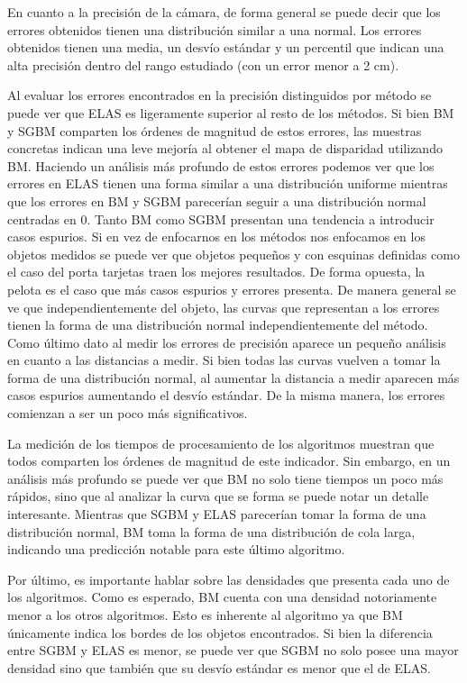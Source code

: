 \documentclass[11pt,a4paper,titlepage]{article}
\begin{document}
En cuanto a la precisión de la cámara, de forma general se puede decir que los errores obtenidos tienen una distribución similar a una normal. Los errores obtenidos tienen una media, un desvío estándar y un percentil que indican una alta precisión dentro del rango estudiado (con un error menor a 2 cm).

Al evaluar los errores encontrados en la precisión distinguidos por método se puede ver que ELAS es ligeramente superior al resto de los métodos. Si bien BM y SGBM comparten los órdenes de magnitud de estos errores, las muestras concretas indican una leve mejoría al obtener el mapa de disparidad utilizando BM.
Haciendo un análisis más profundo de estos errores podemos ver que los errores en ELAS tienen una forma similar a una distribución uniforme mientras que los errores en BM y SGBM parecerían seguir a una distribución normal centradas en 0. Tanto BM como SGBM presentan una tendencia a introducir casos espurios.
Si en vez de enfocarnos en los métodos nos enfocamos en los objetos medidos se puede ver que objetos pequeños y con esquinas definidas como el caso del porta tarjetas traen los mejores resultados. De forma opuesta, la pelota es el caso que más casos espurios y errores presenta. De manera general se ve que independientemente del objeto, las curvas que representan a los errores tienen la forma de una distribución normal independientemente del método.
Como último dato al medir los errores de precisión aparece un pequeño análisis en cuanto a las distancias a medir. Si bien todas las curvas vuelven a tomar la forma de una distribución normal, al aumentar la distancia a medir aparecen más casos espurios aumentando el desvío estándar. De la misma manera, los errores comienzan a ser un poco más significativos.

La medición de los tiempos de procesamiento de los algoritmos muestran que todos comparten los órdenes de magnitud de este indicador. Sin embargo, en un análisis más profundo se puede ver que BM no solo tiene tiempos un poco más rápidos, sino que al analizar la curva que se forma se puede notar un detalle interesante. Mientras que SGBM y ELAS parecerían tomar la forma de una distribución normal, BM toma la forma de una distribución de cola larga, indicando una predicción notable para este último algoritmo.

Por último, es importante hablar sobre las densidades que presenta cada uno de los algoritmos. Como es esperado, BM cuenta con una densidad notoriamente menor a los otros algoritmos. Esto es inherente al algoritmo ya que BM únicamente indica los bordes de los objetos encontrados. Si bien la diferencia entre SGBM y ELAS es menor, se puede ver que SGBM no solo posee una mayor densidad sino que también que su desvío estándar es menor que el de ELAS.
\end{document}
